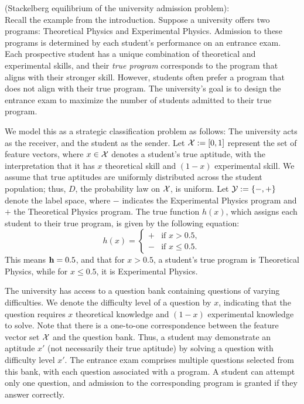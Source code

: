 \begin{exg}(Stackelberg equilibrium of the university admission problem):\\

Recall the example from the introduction. Suppose a university offers two programs: Theoretical Physics and Experimental Physics. Admission to these programs is determined by each student’s performance on an entrance exam. Each prospective student has a unique combination of theoretical and experimental skills, and their \textit{true program} corresponds to the program that aligns with their stronger skill. However, students often prefer a program that does not align with their true program. The university’s goal is to design the entrance exam to maximize the number of students admitted to their true program.

We model this as a strategic classification problem as follows: The university acts as the receiver, and the student as the sender. Let $\mathcal{X} := [0,1]$ represent the set of feature vectors, where $x \in \mathcal{X}$ denotes a student's true aptitude, with the interpretation that it has $x$ theoretical skill and $(1 - x)$ experimental skill. We assume that true aptitudes are uniformly distributed across the student population; thus, $D$, the probability law on $\mathcal{X}$, is uniform. Let $\mathcal{Y} := \{\mathbf{-},\mathbf{+}\}$ denote the label space, where $\minus$ indicates the Experimental Physics program and $\plus$ the Theoretical Physics program. The true function $h(x)$, which assigns each student to their true program, is given by the following equation:
\begin{equation}
    h(x) = \begin{cases}
    \plus & \text{if } x > 0.5, \\
    \minus & \text{if } x \leq 0.5.
    \end{cases}
\end{equation}
This means $\mathbf{h} = 0.5$, and that for $x > 0.5$, a student’s true program is Theoretical Physics, while for $x \leq 0.5$, it is Experimental Physics.

The university has access to a question bank containing questions of varying difficulties. We denote the difficulty level of a question by $x$, indicating that the question requires $x$ theoretical knowledge and $(1 - x)$ experimental knowledge to solve. Note that there is a one-to-one correspondence between the feature vector set $\mathcal{X}$ and the question bank. Thus, a student may demonstrate an aptitude $x'$ (not necessarily their true aptitude) by solving a question with difficulty level $x'$. The entrance exam comprises multiple questions selected from this bank, with each question associated with a program. A student can attempt only one question, and admission to the corresponding program is granted if they answer correctly.


\end{exg}
